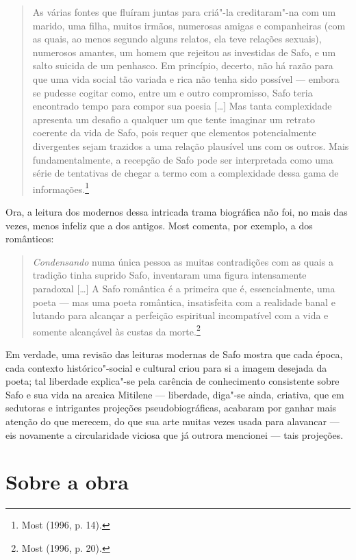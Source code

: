 \begin{quote}
As várias fontes que fluíram juntas para criá"-la creditaram"-na com um marido,
uma filha, muitos irmãos, numerosas amigas e companheiras (com as quais, ao
menos segundo alguns relatos, ela teve relações sexuais), numerosos amantes, um
homem que rejeitou as investidas de Safo, e um salto suicida de um penhasco. Em
princípio, decerto, não há razão para que uma vida social tão variada e rica
não tenha sido possível --- embora se pudesse cogitar como, entre um e outro
compromisso, Safo teria encontrado tempo para compor sua poesia [\ldots{}] Mas tanta
complexidade apresenta um desafio a qualquer um que tente imaginar um retrato
coerente da vida de Safo, pois requer que elementos potencialmente divergentes
sejam trazidos a uma relação plausível uns com os outros. Mais
fundamentalmente, a recepção de Safo pode ser interpretada como uma série de
tentativas de chegar a termo com a complexidade dessa gama de informações.\footnote{ Most (1996, p. 14).}
\end{quote}

Ora, a leitura dos modernos dessa intricada trama biográfica não foi, no mais
das vezes, menos infeliz que a dos antigos. Most comenta, por exemplo,
a dos românticos:

\begin{quote}
\textit{Condensando} numa única pessoa as muitas contradições com as quais a
tradição tinha suprido Safo, inventaram uma figura intensamente paradoxal
[\ldots{}] A Safo romântica é a primeira que é, essencialmente, uma poeta --- mas uma
poeta romântica, insatisfeita com a realidade banal e lutando para alcançar a
perfeição espiritual incompatível com a vida e somente alcançável às custas da
morte.\footnote{ Most (1996, p. 20).}
\end{quote}

Em verdade, uma revisão das leituras modernas de Safo mostra que cada época,
cada contexto histórico"-social e cultural criou para si a imagem desejada da
poeta; tal liberdade explica"-se pela carência de conhecimento consistente sobre
Safo e sua vida na arcaica Mitilene --- liberdade, diga"-se ainda, criativa, que
em sedutoras e intrigantes projeções pseudobiográficas, acabaram por
ganhar mais atenção do que merecem, do que sua arte
muitas vezes usada para alavancar --- eis novamente a circularidade viciosa que
já outrora mencionei --- tais projeções. 

\section{Sobre a obra}

